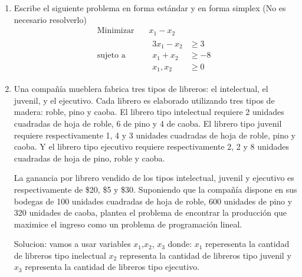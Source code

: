 \documentclass[twocolumn]{article}
\begin{document}
\begin{enumerate}
\item Escribe el siguiente problema en forma estándar y en forma simplex
(No es necesario resolverlo)
\begin{equation*}
\begin{aligned}
\text{Minimizar} \quad & x_{1}-x_{2}\\
\text{sujeto a} \quad &
  \begin{aligned}
   3x_{1}-x_{2} & \geq 3\\
   x_{1}+x_{2} &\geq -8\\
   x_{1},x_{2} &\geq 0
  \end{aligned}
\end{aligned}
\end{equation*}

\item Una compañía mueblera fabrica tres tipos de libreros: el
\guillemotleft{}intelectual\guillemotright{}, el \guillemotleft{}juvenil\guillemotright{}, y el \guillemotleft{}ejecutivo\guillemotright{}. Cada librero es
elaborado utilizando tres tipos de madera: roble, pino y caoba. El
librero tipo \guillemotleft{}intelectual\guillemotright{} requiere 2 unidades cuadradas de hoja de
roble, 6 de pino y 4 de caoba. El librero tipo \guillemotleft{}juvenil\guillemotright{} requiere
respectivamente 1, 4 y 3 unidades cuadradas de hoja de roble, pino
y caoba. Y el librero tipo \guillemotleft{}ejecutivo\guillemotright{} requiere respectivamente 2,
2 y 8 unidades cuadradas de hoja de pino, roble y caoba.

La ganancia por librero vendido de los tipos \guillemotleft{}intelectual\guillemotright{},
\guillemotleft{}juvenil\guillemotright{} y \guillemotleft{}ejecutivo\guillemotright{} es respectivamente de \$20, \$5 y
\$30. Suponiendo que la compañía dispone en sus bodegas de 100
unidades cuadradas de hoja de roble, 600 unidades de pino y 320
unidades de caoba, plantea el problema de encontrar la producción
que maximice el ingreso como un problema de programación lineal.

Solucion: vamos a usar variables $x _1$,$x _2$, $x _3$ donde:
$x _1$ reperesenta la cantidad de libreros tipo inelectual
$x _2$ representa la cantidad de libreros tipo juvenil y
$x _3$ representa la cantidad de libreros tipo ejecutivo.


\end{enumerate}
\end{document}
